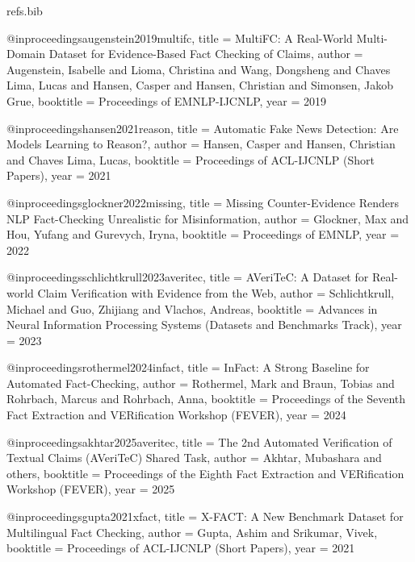 \begin{filecontents*}[overwrite]{refs.bib}

@inproceedings{augenstein2019multifc,
  title     = {{MultiFC}: A Real-World Multi-Domain Dataset for Evidence-Based Fact Checking of Claims},
  author    = {Augenstein, Isabelle and Lioma, Christina and Wang, Dongsheng and Chaves Lima, Lucas and Hansen, Casper and Hansen, Christian and Simonsen, Jakob Grue},
  booktitle = {Proceedings of EMNLP-IJCNLP},
  year      = {2019}
}

@inproceedings{hansen2021reason,
  title     = {Automatic Fake News Detection: Are Models Learning to Reason?},
  author    = {Hansen, Casper and Hansen, Christian and Chaves Lima, Lucas},
  booktitle = {Proceedings of ACL-IJCNLP (Short Papers)},
  year      = {2021}
}

@inproceedings{glockner2022missing,
  title     = {Missing Counter-Evidence Renders {NLP} Fact-Checking Unrealistic for Misinformation},
  author    = {Glockner, Max and Hou, Yufang and Gurevych, Iryna},
  booktitle = {Proceedings of EMNLP},
  year      = {2022}
}

@inproceedings{schlichtkrull2023averitec,
  title     = {{AVeriTeC}: A Dataset for Real-world Claim Verification with Evidence from the Web},
  author    = {Schlichtkrull, Michael and Guo, Zhijiang and Vlachos, Andreas},
  booktitle = {Advances in Neural Information Processing Systems (Datasets and Benchmarks Track)},
  year      = {2023}
}

@inproceedings{rothermel2024infact,
  title     = {{InFact}: A Strong Baseline for Automated Fact-Checking},
  author    = {Rothermel, Mark and Braun, Tobias and Rohrbach, Marcus and Rohrbach, Anna},
  booktitle = {Proceedings of the Seventh Fact Extraction and VERification Workshop (FEVER)},
  year      = {2024}
}

@inproceedings{akhtar2025averitec,
  title     = {The 2nd Automated Verification of Textual Claims ({AVeriTeC}) Shared Task},
  author    = {Akhtar, Mubashara and others},
  booktitle = {Proceedings of the Eighth Fact Extraction and VERification Workshop (FEVER)},
  year      = {2025}
}

@inproceedings{gupta2021xfact,
  title     = {{X-FACT}: A New Benchmark Dataset for Multilingual Fact Checking},
  author    = {Gupta, Ashim and Srikumar, Vivek},
  booktitle = {Proceedings of ACL-IJCNLP (Short Papers)},
  year      = {2021}
}


\end{filecontents*}
